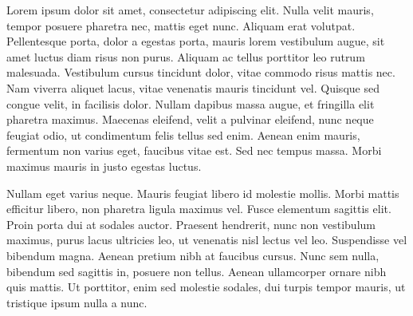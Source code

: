 Lorem ipsum dolor sit amet, consectetur adipiscing elit. Nulla velit mauris, tempor posuere pharetra nec, mattis eget nunc. Aliquam erat volutpat. Pellentesque porta, dolor a egestas porta, mauris lorem vestibulum augue, sit amet luctus diam risus non purus. Aliquam ac tellus porttitor leo rutrum malesuada. Vestibulum cursus tincidunt dolor, vitae commodo risus mattis nec. Nam viverra aliquet lacus, vitae venenatis mauris tincidunt vel. Quisque sed congue velit, in facilisis dolor. Nullam dapibus massa augue, et fringilla elit pharetra maximus. Maecenas eleifend, velit a pulvinar eleifend, nunc neque feugiat odio, ut condimentum felis tellus sed enim. Aenean enim mauris, fermentum non varius eget, faucibus vitae est. Sed nec tempus massa. Morbi maximus mauris in justo egestas luctus.

Nullam eget varius neque. Mauris feugiat libero id molestie mollis. Morbi mattis efficitur libero, non pharetra ligula maximus vel. Fusce elementum sagittis elit. Proin porta dui at sodales auctor. Praesent hendrerit, nunc non vestibulum maximus, purus lacus ultricies leo, ut venenatis nisl lectus vel leo. Suspendisse vel bibendum magna. Aenean pretium nibh at faucibus cursus. Nunc sem nulla, bibendum sed sagittis in, posuere non tellus. Aenean ullamcorper ornare nibh quis mattis. Ut porttitor, enim sed molestie sodales, dui turpis tempor mauris, ut tristique ipsum nulla a nunc.